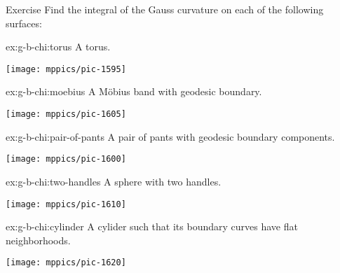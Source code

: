 \begin{thm}{Exercise}\label{ex:g-b-chi}
Find the integral of the Gauss curvature on each of the following surfaces:

\setlength{\columnseprule}{0.4pt}
\begin{multicols}{2}

\begin{subthm}{ex:g-b-chi:torus}
A torus.
\end{subthm}

\begin{Figure}
\vskip-0mm
\centering
\texttt{[image: mppics/pic-1595]}
\end{Figure}

\begin{subthm}{ex:g-b-chi:moebius}
A Möbius band with geodesic boundary.
\end{subthm}

\begin{Figure}
\vskip-0mm
\centering
\texttt{[image: mppics/pic-1605]}
\end{Figure}

\begin{subthm}{ex:g-b-chi:pair-of-pants}
A pair of pants with geodesic boundary components.
\end{subthm}
\begin{Figure}
\vskip-0mm
\centering
\texttt{[image: mppics/pic-1600]}
\end{Figure}

\begin{subthm}{ex:g-b-chi:two-handles}
A sphere with two handles.
\end{subthm}

\begin{Figure}
\vskip-0mm
\centering
\texttt{[image: mppics/pic-1610]}
\end{Figure}

\end{multicols}

\begin{subthm}{ex:g-b-chi:cylinder}
A cylider such that its boundary curves have flat neighborhoods. 
\begin{Figure}
\vskip-0mm
\centering
\texttt{[image: mppics/pic-1620]}
\end{Figure}
\end{subthm}


\end{thm}

